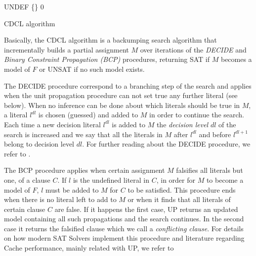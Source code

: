 \begin{algorithm}[h]
\SetAlgoLined
{}
 \BlankLine
 \Status \assign UNDEF\;
 \Model \assign \{\}\;
 \Dl \assign $0$\;
 \Return \Status
 \caption{CDCL algorithm}
 \label{alg:cdcl}
\end{algorithm}

Basically, the CDCL algorithm is a backumping search algorithm that
incrementally builds a partial assignment $M$ over iterations of the
\emph{DECIDE} and \emph{Binary Constraint Propagation (BCP)} procedures, 
returning SAT if
$M$ becomes a model of $F$ or UNSAT if no such model exists.

The DECIDE procedure correspond to a branching step of the search and
applies when the unit propagation procedure can not set true any
further literal (see below).  When no inference can be done about
which literals should be true in $M$, a literal $l^{dl}$ is chosen
(guessed) and added to $M$ in order to continue the search.  Each time
a new decision literal $l^{dl}$ is added to $M$ the \emph{ decision
  level} $dl$ of the search is increased and we say that all the
literals in $M$ after $l^{dl}$ and before $l^{dl+1}$ belong to
decision level $dl$.  For further reading about the DECIDE procedure,
we refer to \cite{Chaff2001,MiniSat,rsat}.

The BCP procedure applies when certain assignment $M$
falsifies all literals but one, of a clause $C$.  If $l$ is the
undefined literal in $C$, in order for $M$ to become a model of $F$,
$l$ must be added to $M$ for $C$ to be satisfied. This procedure ends
when there is no literal left to add to $M$ or when it finds that all
literals of certain clause $C$ are false.  If it happens the first
case, UP returns an updated model containing all such propagations and
the search continues.  In the second case it returns the falsified
clause which we call a \emph{conflicting clause}.  For details on how
modern SAT Solvers implement this procedure and literature regarding
Cache performance, mainly related with UP, we refer to
\cite{Chaff2001,ZhangMalik2003SAT}
 
